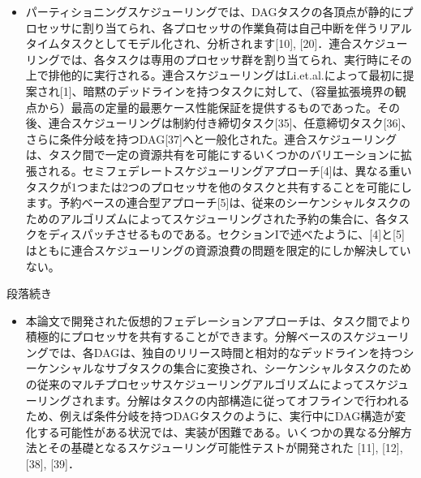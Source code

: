 \begin{frame}{}
    \begin{itemize}
        \item パーティショニングスケジューリングでは、DAGタスクの各頂点が静的にプロセッサに割り当てられ、各プロセッサの作業負荷は自己中断を伴うリアルタイムタスクとしてモデル化され、分析されます[10], [20]．連合スケジューリングでは、各タスクは専用のプロセッサ群を割り当てられ、実行時にその上で排他的に実行される。連合スケジューリングはLi.et.al.によって最初に提案され[1]、暗黙のデッドラインを持つタスクに対して、（容量拡張境界の観点から）最高の定量的最悪ケース性能保証を提供するものであった。その後、連合スケジューリングは制約付き締切タスク[35]、任意締切タスク[36]、さらに条件分岐を持つDAG[37]へと一般化された。連合スケジューリングは、タスク間で一定の資源共有を可能にするいくつかのバリエーションに拡張される。セミフェデレートスケジューリングアプローチ[4]は、異なる重いタスクが1つまたは2つのプロセッサを他のタスクと共有することを可能にします。予約ベースの連合型アプローチ[5]は、従来のシーケンシャルタスクのためのアルゴリズムによってスケジューリングされた予約の集合に、各タスクをディスパッチさせるものである。セクションIで述べたように、[4]と[5]はともに連合スケジューリングの資源浪費の問題を限定的にしか解決していない。
    \end{itemize}
\end{frame}

\begin{frame}{段落続き}
    \begin{itemize}
        \item 本論文で開発された仮想的フェデレーションアプローチは、タスク間でより積極的にプロセッサを共有することができます。分解ベースのスケジューリングでは、各DAGは、独自のリリース時間と相対的なデッドラインを持つシーケンシャルなサブタスクの集合に変換され、シーケンシャルタスクのための従来のマルチプロセッサスケジューリングアルゴリズムによってスケジューリングされます。分解はタスクの内部構造に従ってオフラインで行われるため、例えば条件分岐を持つDAGタスクのように、実行中にDAG構造が変化する可能性がある状況では、実装が困難である。いくつかの異なる分解方法とその基礎となるスケジューリング可能性テストが開発された [11], [12], [38], [39]．
    \end{itemize}
\end{frame}
